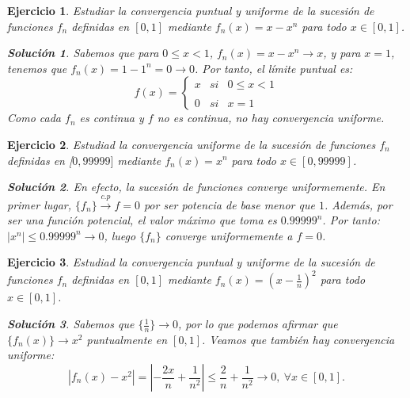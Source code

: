 \documentclass[11pt, a4paper]{article}
\newcommand{\fn}{\{f_n\}}
\theoremstyle{theorem-style}
\theoremstyle{definition-style}
\newtheorem{ejer}{Ejercicio}[section]
\theoremstyle{remark-style}
\newtheorem*{sol}{Solución}
\theoremstyle{example-style}
\begin{document}
\begin{ejer}
  Estudiar la convergencia puntual y uniforme de la sucesión de funciones $f_n$ definidas en $[0,1]$ mediante $f_n(x) = x-x^n$ para todo $x\in [0,1]$.

  \begin{sol}
    Sabemos que para $0\le x<1$, $f_n(x)=x-x^n \to x$, y para $x=1$, tenemos que $f_n(x)=1-1^n = 0 \to 0$. Por tanto, el límite puntual es: $$f(x)= \left\{ \begin{array}{lcc} x & si & 0 \le x < 1 \\ \\ 0 & si & x=1  \end{array} \right.$$
    Como cada $f_n$ es continua y $f$ no es continua, no hay convergencia uniforme. 
  \end{sol}
\end{ejer}

\begin{ejer}
  Estudiad la convergencia uniforme de la sucesión de funciones $f_n$ definidas en [$0,99999]$ mediante $f_n(x) = x^n$ para todo $x\in [0,99999]$.

  \begin{sol}
    En efecto, la sucesión de funciones converge uniformemente. En primer lugar, $\fn \xrightarrow {c.p} f=0$ por ser potencia de base menor que $1$. Además, por ser una función potencial, el valor máximo que toma es $0.99999^n$. Por tanto: $|x^n| \leq 0.99999^n \to 0$, luego $\fn$ converge uniformemente a $f=0$. 
  \end{sol}
\end{ejer}

\begin{ejer}
  Estudiad la convergencia puntual y uniforme de la sucesión de funciones $f_n$ definidas en $[0,1]$ mediante $f_n(x) = (x-\frac{1}{n})^2$ para todo $x\in [0,1]$.
  
  \begin{sol}
    Sabemos que $\{\frac{1}{n}\} \to 0$, por lo que podemos afirmar que $\{f_n(x)\} \to x^2$ puntualmente en $[0,1]$. Veamos que también hay convergencia uniforme: $$|f_n (x) - x^2| = \left|-\frac{2x}{n} + \frac{1}{n^2} \right| \leq \frac{2}{n} + \frac{1}{n^2}\to 0, \ \forall x\in [0,1].$$
  \end{sol}
\end{ejer}
\end{document}
